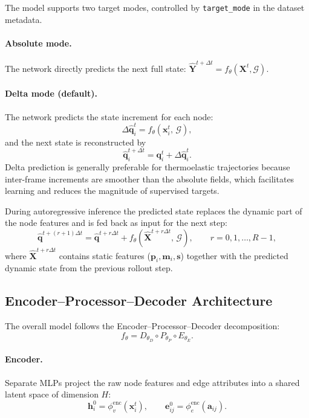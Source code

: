 The model supports two target modes, controlled by \texttt{target\_mode} in
the dataset metadata.

\paragraph{Absolute mode.}
The network directly predicts the next full state:
\(\hat{\mathbf{Y}}^{t+\Delta t} = f_{\theta}(\mathbf{X}^{t},\mathcal{G})\).

\paragraph{Delta mode (default).}
The network predicts the state increment for each node:
\[
  \Delta\hat{\mathbf{q}}_i^t
  = f_{\theta}\!\left(\mathbf{x}_i^t,\,\mathcal{G}\right),
\]
and the next state is reconstructed by
\[
  \hat{\mathbf{q}}_i^{t+\Delta t}
  = \mathbf{q}_i^t + \Delta\hat{\mathbf{q}}_i^t.
\]
Delta prediction is generally preferable for thermoelastic trajectories because
inter-frame increments are smoother than the absolute fields, which facilitates
learning and reduces the magnitude of supervised targets.

During autoregressive inference the predicted state replaces the dynamic part
of the node features and is fed back as input for the next step:
\[
  \hat{\mathbf{q}}^{t+(r+1)\Delta t}
  = \hat{\mathbf{q}}^{t+r\Delta t}
    + f_{\theta}\!\left(\hat{\mathbf{X}}^{t+r\Delta t},\,\mathcal{G}\right),
  \qquad r = 0,1,\dots,R-1,
\]
where \(\hat{\mathbf{X}}^{t+r\Delta t}\) contains static features
(\(\mathbf{p}_i,\mathbf{m}_i,\mathbf{s}\)) together with the
predicted dynamic state from the previous rollout step.

\subsection{Encoder--Processor--Decoder Architecture}

The overall model follows the Encoder--Processor--Decoder decomposition:
\[
  f_{\theta}
  = D_{\theta_D} \circ P_{\theta_P} \circ E_{\theta_E}.
\]

\paragraph{Encoder.}
Separate MLPs project the raw node features and edge attributes into a shared
latent space of dimension \(H\):
\[
  \mathbf{h}_i^0 = \phi_v^{\mathrm{enc}}(\mathbf{x}_i^t),
  \qquad
  \mathbf{e}_{ij}^0 = \phi_e^{\mathrm{enc}}(\mathbf{a}_{ij}).
\]

